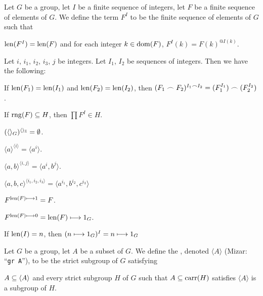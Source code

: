 \documentclass{article}
\begin{document}
\begin{definition}
Let $G$ be a group, let $I$ be a finite sequence of integers, let $F$ be
a finite sequence of elements of $G$. We define the term $F^{I}$ to be
the finite sequence of elements of $G$ such that
\begin{defn}
\item $\operatorname{len}(F^{I})=\operatorname{len}(F)$ and for each integer $k\in\operatorname{dom}(F)$, $F^{I}(k)=F(k)^{@I(k)}$.
\end{defn}
\end{definition}

Let $i$, $i_{1}$, $i_{2}$, $i_{3}$, $j$ be integers.
Let $I_{1}$, $I_{2}$ be sequences of integers. Then we have the following:
\begin{thm}
\item\label{group4:19} If $\operatorname{len}(F_{1})=\operatorname{len}(I_{1})$ and
  $\operatorname{len}(F_{2})=\operatorname{len}(I_{2})$, then $(F_{1}\frown F_{2})^{I_{1}\frown I_{2}}=(F_{1}^{I_{1}})\frown(F_{2}^{I_{2}})$.
\item\label{group4:20} If $\operatorname{rng}(F)\subseteq H$, then $\prod F^{I}\in H$.
\item\label{group4:21} $(\langle\rangle_{G})^{\langle\rangle_{\mathbb{Z}}}=\emptyset$.
\item\label{group4:22} $\langle a\rangle^{\langle i\rangle}=\langle a^{i}\rangle$.
\item\label{group4:23} $\langle a,b\rangle^{\langle i,j\rangle}=\langle a^{i},b^{j}\rangle$.
\item\label{group4:24} $\langle a,b,c\rangle^{\langle i_{1}, i_{2}, i_{3}\rangle} = \langle a^{i_{1}}, b^{i_{2}}, c^{i_{3}}\rangle$
\item\label{group4:25} $F^{\operatorname{len}(F)\longmapsto 1}=F$.
\item\label{group4:26} $F^{\operatorname{len}(F)\longmapsto 0}=\operatorname{len}(F)\longmapsto 1_{G}$.
\item\label{group4:27} If $\operatorname{len}(I)=n$, then $(n\longmapsto 1_{G})^{I}=n\longmapsto 1_{G}$
\end{thm}

\begin{definition}
Let $G$ be a group, let $A$ be a subset of $G$.
We define the , denoted $\langle A\rangle$
(Mizar: ``\verb#gr A#''),
to be the strict subgroup of $G$ satisfying
\begin{defn}
\item $A\subseteq\langle A\rangle$ and every strict subgroup $H$ of $G$ such that
  $A\subseteq\operatorname{carr}(H)$ satisfies $\langle A\rangle$ is a subgroup of $H$.
\end{defn}
\end{definition}
\end{document}
